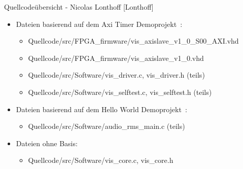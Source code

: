 \begin{frame}{Quellcodeübersicht - Nicolas Lonthoff [Lonthoff]}
    \begin{itemize}
        \item Dateien basierend auf dem Axi Timer Demoprojekt~\cite{at_demoprojekt}:
        \begin{itemize}
            \item Quellcode/src/FPGA\_firmware/vis\_axislave\_v1\_0\_S00\_AXI.vhd
            \item Quellcode/src/FPGA\_firmware/vis\_axislave\_v1\_0.vhd
            \item Quellcode/src/Software/vis\_driver.c, vis\_driver.h (teils)
            \item Quellcode/src/Software/vis\_selftest.c, vis\_selftest.h (teils)
        \end{itemize}
        \item Dateien basierend auf dem Hello World Demoprojekt~\cite{hello_demoprojekt}:
        \begin{itemize}
            \item Quellcode/src/Software/audio\_rms\_main.c (teils)
        \end{itemize}
        \item Dateien ohne Basis:
        \begin{itemize}
            \item Quellcode/src/Software/vis\_core.c, vis\_core.h
        \end{itemize}
    \end{itemize}
\end{frame}
